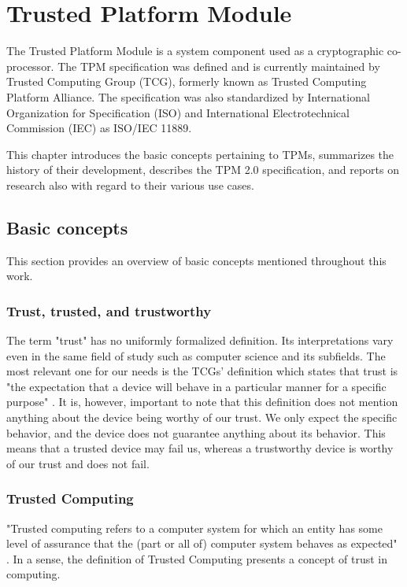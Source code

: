 \chapter{Trusted Platform Module}
The Trusted Platform Module is a system component used as a cryptographic co-processor. The TPM specification was defined and is currently maintained by Trusted Computing Group (TCG), formerly known as Trusted Computing Platform Alliance. The specification was also standardized by International Organization for Specification (ISO) and International Electrotechnical Commission (IEC) as ISO/IEC 11889.

This chapter introduces the basic concepts pertaining to TPMs, summarizes the history of their development, describes the TPM 2.0 specification, and reports on research also with regard to their various use cases. 

\section{Basic concepts}
This section provides an overview of basic concepts mentioned throughout this work.

\subsection{Trust, trusted, and trustworthy}\label{sec:trust-def}
The term "trust" has no uniformly formalized definition. Its interpretations vary even in the same field of study such as computer science and its subfields. The most relevant one for our needs is the TCGs' definition which states that trust is "the expectation that a device will behave in a particular manner for a specific purpose" \cite{tcg_arch_overview}. It is, however, important to note that this definition does not mention anything about the device being worthy of our trust. We only expect the specific behavior, and the device does not guarantee anything about its behavior. This means that a trusted device may fail us, whereas a trustworthy device is worthy of our trust and does not fail.

\subsection{Trusted Computing}
"Trusted computing refers to a computer system for which an entity has some level of assurance that the (part or all of) computer system behaves as expected" \cite{mitchell2005trusted}. In a sense, the definition of Trusted Computing presents a concept of trust in computing.

